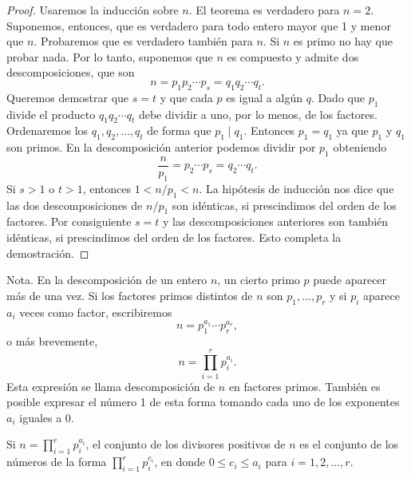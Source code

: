 \documentclass[12pt,a4paper]{book}
\begin{document}
    \begin{proof}
        Usaremos la inducción sobre $n$. El teorema es verdadero para $n=2$. Suponemos,
        entonces, que es verdadero para todo entero mayor que 1 y menor que $n$. Probaremos
        que es verdadero también para $n$. Si $n$ es primo no hay que probar nada. Por lo
        tanto, suponemos que $n$ es compuesto y admite dos descomposiciones, que son
        \begin{equation*}
            n=p_{1}p_{2}\cdots p_{s}=q_{1}q_{2}\cdots q_{t}.
        \end{equation*}
        Queremos demostrar que $s=t$ y que cada $p$ es igual a algún $q$. Dado que $p_{1}$
        divide el producto $q_{1}q_{2}\cdots q_{t}$ debe dividir a uno, por lo menos, de los
        factores. Ordenaremos los $q_{1},q_{2},\dots,q_{t}$ de forma que $p_{1}\mid q_{1}$. Entonces
        $p_{1}=q_{1}$ ya que $p_{1}$ y $q_{1}$ son primos. En la descomposición anterior podemos
        dividir por $p_{1}$ obteniendo
        \begin{equation*}
            \frac{n}{p_{1}}=p_{2}\cdots p_{s}=q_{2}\cdots q_{t}.
        \end{equation*}
        Si $s>1$ o $t>1$, entonces $1<n/p_{1}<n$. La hipótesis de inducción nos dice que las
        dos descomposiciones de $n/p_{1}$ son idénticas, si prescindimos del orden de los
        factores. Por consiguiente $s=t$ y las descomposiciones anteriores son también
        idénticas, si prescindimos del orden de los factores. Esto completa la demostración.
    \end{proof}

    Nota. En la descomposición de un entero $n$, un cierto primo $p$ puede aparecer más de
    una vez. Si los factores primos distintos de $n$ son $p_{1},\dots,p_{r}$ y si $p_{i}$ aparece
    $a_{i}$ veces como factor, escribiremos
    \begin{equation*}
        n=p_{1}^{a_{1}}\cdots p_{r}^{a_{r}},
    \end{equation*}
    o más brevemente,
    \begin{equation*}
        n=\prod_{i=1}^{r}p_{i}^{a_{i}}.
    \end{equation*}
    Esta expresión se llama descomposición de $n$ en factores primos. También es posible
    expresar el número 1 de esta forma tomando cada uno de los exponentes $a_{i}$ iguales a 0.

    \begin{teorema}
        Si $n=\prod_{i=1}^{r}p_{i}^{a_{i}}$, el conjunto de los divisores positivos de $n$ es el
        conjunto de los números de la forma $\prod_{i=1}^{r}p_{i}^{c_{i}}$, en donde
        $0\leq c_{i}\leq a_{i}$ para $i=1,2,\dots,r$.
    \end{teorema}
\end{document}
